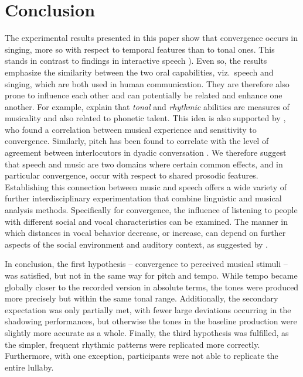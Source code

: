 \section{Conclusion}
\label{sec:conclusion_shadowing}


The experimental results presented in this paper show that convergence occurs in singing, more so with respect to temporal features than to tonal ones.
This stands in contrast to findings in interactive speech \citep[e.g.,][]{Raveh2019InterspeechAlexa}).
Even so, the results emphasize the similarity between the two oral capabilities, viz.\ speech and singing, which are both used in human communication.
They are therefore also prone to influence each other and can potentially be related and enhance one another.
For example, \citet[][p. 216]{Nardo2009musicality} explain that \emph{tonal} and \emph{rhythmic} abilities are measures of musicality and also related to phonetic talent.
This idea is also supported by \citet{Tsang2018musical}, who found a correlation between musical experience and sensitivity to convergence.
Similarly, pitch has been found to correlate with the level of agreement between interlocutors in dyadic conversation \citep{Okada2012interpreting}.
We therefore suggest that speech and music are two domains where certain common effects, and in particular convergence, occur with respect to shared prosodic features.
Establishing this connection between music and speech offers a wide variety of further interdisciplinary experimentation that combine linguistic and musical analysis methods.
Specifically for convergence, the influence of listening to people with different social and vocal characteristics can be examined.
The manner in which distances in vocal behavior decrease, or increase, can depend on further aspects of the social environment and auditory context, as suggested by \citet{Noy1999psychoanalysis}.

In conclusion, the first hypothesis -- convergence to perceived musical stimuli -- was satisfied, but not in the same way for pitch and tempo.
While tempo became globally closer to the recorded version in absolute terms, the tones were produced more precisely but within the same tonal range.
Additionally, the secondary expectation was only partially met, with fewer large deviations occurring in the shadowing performances, but otherwise the tones in the baseline production were slightly more accurate as a whole.
Finally, the third hypothesis was fulfilled, as the simpler, frequent rhythmic patterns were replicated more correctly.
Furthermore, with one exception, participants were not able to replicate the entire lullaby.



